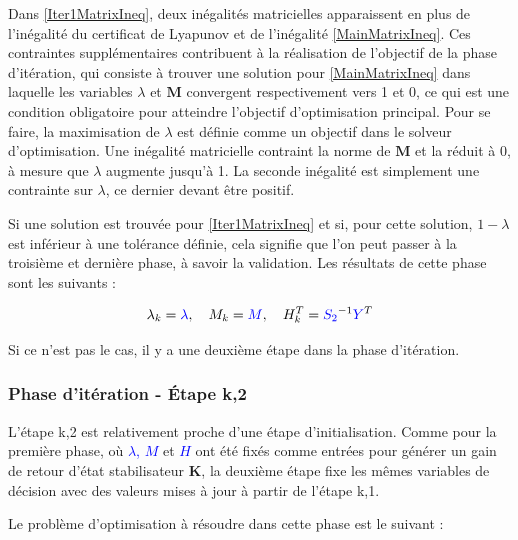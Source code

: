 Dans \eqref{Iter1MatrixIneq}, deux inégalités matricielles apparaissent en plus de l'inégalité du certificat de Lyapunov et de l'inégalité \eqref{MainMatrixIneq}. Ces contraintes supplémentaires contribuent à la réalisation de l'objectif de la phase d'itération, qui consiste à trouver une solution pour \eqref{MainMatrixIneq} dans laquelle les variables $\lambda$ et $\boldsymbol{M}$ convergent respectivement vers 1 et 0, ce qui est une condition obligatoire pour atteindre l'objectif d'optimisation principal. Pour se faire, la maximisation de $\lambda$ est définie comme un objectif dans le solveur d'optimisation. Une inégalité matricielle contraint la norme de $\boldsymbol{M}$ et la réduit à 0, à mesure que $\lambda$ augmente jusqu'à 1. La seconde inégalité est simplement une contrainte sur $\lambda$, ce dernier devant être positif.


Si une solution est trouvée pour \eqref{Iter1MatrixIneq} et si, pour cette solution, $1-\lambda$ est inférieur à une tolérance définie, cela signifie que l'on peut passer à la troisième et dernière phase, à savoir la validation. Les résultats de cette phase sont les suivants :

\begin{equation}
    \begin{gathered}
        \lambda_k=\textcolor{blue}{\lambda},  \quad
        M_k = \textcolor{blue}{M}, \quad
        H_k^T = \textcolor{blue}{S_2}^{-1} \textcolor{blue}{Y}^T
    \end{gathered}
    \label{OutputsIterStap2}
\end{equation}

Si ce n'est pas le cas, il y a une deuxième étape dans la phase d'itération.

\subsubsection{Phase d'itération - Étape k,2}


L'étape k,2 est relativement proche d'une étape d'initialisation. Comme pour la première phase, où \textcolor{blue}{$\lambda$, $M$} et \textcolor{blue}{$H$} ont été fixés comme entrées pour générer un gain de retour d'état stabilisateur $\boldsymbol{K}$, la deuxième étape fixe les mêmes variables de décision avec des valeurs mises à jour à partir de l'étape k,1.

Le problème d'optimisation à résoudre dans cette phase est le suivant :


